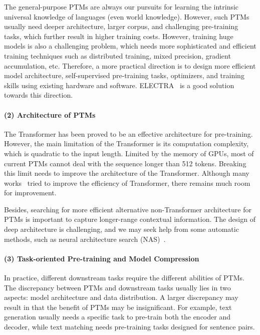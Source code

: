 \documentclass[fleqn]{SCYE-arxiv}
\begin{document}
\begin{multicols}{2}
The general-purpose PTMs are always our pursuits for learning the intrinsic universal knowledge of languages (even world knowledge). However, such PTMs usually need deeper architecture, larger corpus, and challenging pre-training tasks, which further result in higher training costs.
However, training huge models is also a challenging problem, which needs more sophisticated and efficient training techniques such as distributed training, mixed precision, gradient accumulation, etc.
Therefore, a more practical direction is to design more efficient model architecture, self-supervised pre-training tasks, optimizers, and training skills using existing hardware and software. ELECTRA~\cite{clark2020electra} is a good solution towards this direction.


\paragraph{(2) Architecture of PTMs}

The Transformer has been proved to be an effective architecture for pre-training. However, the main limitation of the Transformer is its computation complexity, which is quadratic to the input length. Limited by the memory of GPUs, most of current PTMs cannot deal with the sequence longer than 512 tokens.
Breaking this limit needs to improve the architecture of the Transformer. Although many works~\cite{lin2021survey} tried to improve the efficiency of Transformer, there remains much room for improvement.

Besides, searching for more efficient alternative non-Transformer architecture for PTMs is important to capture longer-range contextual information.
The design of deep architecture is challenging, and we may seek help from some automatic methods, such as neural architecture search (NAS)~\cite{zoph2016neural}.


\paragraph{(3) Task-oriented Pre-training and Model Compression}

In practice, different downstream tasks require the different abilities of PTMs. The discrepancy between PTMs and downstream tasks usually lies in two aspects: model architecture and data distribution.
A larger discrepancy may result in that the benefit of PTMs may be insignificant.
For example, text generation usually needs a specific task to pre-train both the encoder and decoder, while text matching needs pre-training tasks designed for sentence pairs.


\end{multicols}
\end{document}
